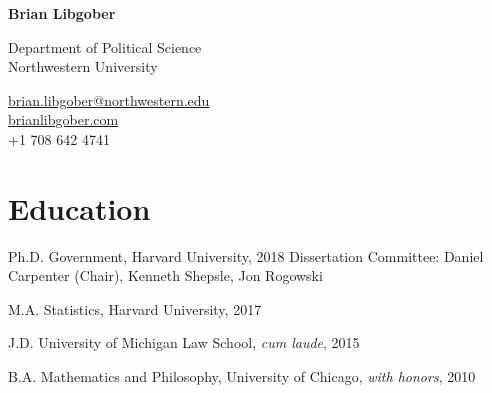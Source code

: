 \documentclass[12pt,letterpaper]{report}
\newcommand{\myname}{Brian Libgober}
\newcommand{\namefont}[1]{{\normalfont\bfseries\Huge{#1}}}
\begin{document}
	\pagestyle{fancy}
	\fancyhf{}
    \fancyfoot[C]{\thepage}  %
    \renewcommand{\footrulewidth}{0pt}  %
	\renewcommand{\headrulewidth}{0pt}
    \raggedright{}

    \begin{minipage}[t]{0.6\textwidth}
	\raggedright{}
    \namefont{\myname}
	\end{minipage}
	\hfill
    \vspace{1em}
    \begin{minipage}[t]{0.6\textwidth}
        \flushleft{} Department of Political Science \\
         Northwestern University
    \end{minipage}
    \hfill
    \begin{minipage}[t]{0.395\textwidth}
        \flushright{}
        \href{mailto:brian.libgober@northwestern.edu}{brian.libgober@northwestern.edu} \\
        \href{https://brianlibgober.com}{brianlibgober.com} \\
         +1 708 642 4741 \\
    \end{minipage}

    \section*{Education}

    \begin{tablist}

        \item[Ph.D.] \tab{}Government, Harvard University, 2018 \newline Dissertation Committee: Daniel Carpenter (Chair), Kenneth Shepsle, Jon Rogowski
        \item[M.A.]  \tab{}Statistics, Harvard University, 2017
        \item[J.D.]  \tab{}University of Michigan Law School, \textit{cum laude}, 2015
        \item[B.A.]  \tab{}Mathematics and Philosophy, University of Chicago, \textit{with honors}, 2010

    \end{tablist}
\end{document}
